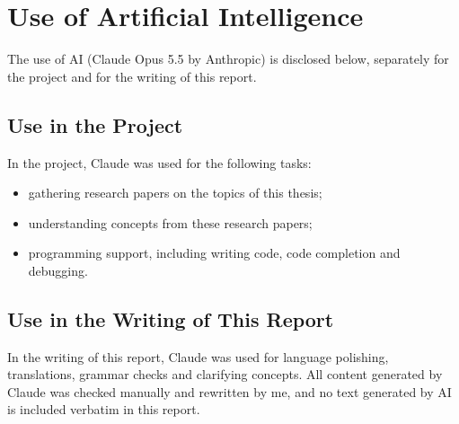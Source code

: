 \documentclass{rptuma}
\begin{document}
\chapter*{Use of Artificial Intelligence}
\label{chap:ai}

The use of AI (Claude Opus 5.5 by Anthropic) is disclosed below, separately for the project and for the writing
of this report.

\section*{Use in the Project}

In the project, Claude was used for the following tasks:
\begin{itemize}
  \item gathering research papers on the topics of this thesis;
  \item understanding concepts from these research papers;
  \item programming support, including writing code, code completion and debugging.
\end{itemize}

\section*{Use in the Writing of This Report}

In the writing of this report, Claude was used for language polishing, translations, grammar
checks and clarifying concepts. All content generated by Claude was checked manually and rewritten
by me, and no text generated by AI is included verbatim in this report.
\end{document}
